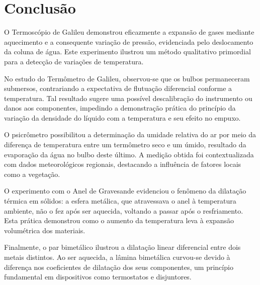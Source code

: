 \section{Conclusão} 
O Termoscópio de Galileu demonstrou eficazmente a expansão de gases mediante aquecimento e a consequente variação de pressão, evidenciada pelo deslocamento da coluna de água. Este experimento ilustrou um método qualitativo primordial para a detecção de variações de temperatura.

No estudo do Termômetro de Galileu, observou-se que os bulbos permaneceram submersos, contrariando a expectativa de flutuação diferencial conforme a temperatura. Tal resultado sugere uma possível descalibração do instrumento ou danos aos componentes, impedindo a demonstração prática do princípio da variação da densidade do líquido com a temperatura e seu efeito no empuxo.

O psicrômetro possibilitou a determinação da umidade relativa do ar por meio da diferença de temperatura entre um termômetro seco e um úmido, resultado da evaporação da água no bulbo deste último. A medição obtida foi contextualizada com dados meteorológicos regionais, destacando a influência de fatores locais como a vegetação.

O experimento com o Anel de Gravesande evidenciou o fenômeno da dilatação térmica em sólidos: a esfera metálica, que atravessava o anel à temperatura ambiente, não o fez após ser aquecida, voltando a passar após o resfriamento. Esta prática demonstrou como o aumento da temperatura leva à expansão volumétrica dos materiais.

Finalmente, o par bimetálico ilustrou a dilatação linear diferencial entre dois metais distintos. Ao ser aquecida, a lâmina bimetálica curvou-se devido à diferença nos coeficientes de dilatação dos seus componentes, um princípio fundamental em dispositivos como termostatos e disjuntores.
